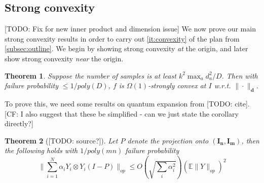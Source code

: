 \documentclass{article}
\newtheorem{theorem}{Theorem}
\renewcommand{\vec}{\bm}
\newcommand{\E}{\mathbb{E}}
\newcommand{\CF}[1]{{\color{purple}[CF: #1]}}
\newcommand{\TODO}[1]{{\color{blue}[TODO: #1]}}
\begin{document}







\subsection{Strong convexity}
\TODO{Fix for new inner product and dimension issue}
We now prove our main strong convexity results in order to carry out \cref{it:convexity} of the plan from \cref{subsec:outline}. We begin by showing strong convexity \emph{at} the origin, and later show strong convexity \emph{near} the origin.
\begin{theorem}\label{thm:tensor-convexity}
Suppose the number of samples is at least $k^{2} \max_{a} d_{a}^{2}/D$. Then with failure probability $\leq 1/poly(D)$, $f$ is $\Omega(1)$-strongly convex at $I$ w.r.t. $\|\cdot \|_{\vec d}$.
\end{theorem}
To prove this, we need some results on quantum expansion from \TODO{cite}. \CF{I also suggest that these be simplified - can we just state the corollary directly?}
\begin{theorem}[\TODO{source?}]
Let $P$ denote the projection onto $(\vec{I_{n}},\vec{I_{m}})$, then the following holds with $1/poly(mn)$ failure probability
\[ \|\sum_{i=1}^{N} \alpha_{i} Y_{i} \otimes Y_{i} (I - P) \|_{op} \leq O \left( \sqrt{\sum_{i} \alpha_{i}^{2}} \right) \left( \E \|Y\|_{op} \right)^{2} \]
\end{theorem}
\end{document}
